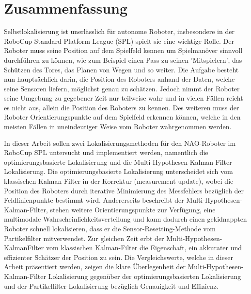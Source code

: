 \thispagestyle{empty}
\chapter*{Zusammenfassung}

Selbstlokalisierung ist unerl{\"a}sslich f{\"u}r autonome Roboter, insbesondere in der RoboCup Standard Platform League (SPL) spielt sie eine wichtige Rolle. Der Roboter muss seine Position auf dem Spielfeld kennen um Spielman{\"o}ver sinnvoll durchf{\"u}hren zu k{\"o}nnen, wie zum Beispiel einen Pass zu seinen 'Mitspielern', das Sch{\"u}tzen des Tores, das Planen von Wegen und so weiter. Die Aufgabe besteht nun haupts{\"a}chlich darin, die Position des Roboters anhand der Daten, welche seine Sensoren liefern, m{\"o}glichst genau zu sch{\"a}tzen. Jedoch nimmt der Roboter seine Umgebung zu gegebener Zeit nur teilweise wahr und in vielen F{\"a}llen reicht es nicht aus, allein die Position des Roboters zu kennen. Des weiteren muss der Roboter Orientierungspunkte auf dem Spielfeld erkennen k{\"o}nnen, welche in den meisten F{\"a}llen in uneindeutiger Weise vom Roboter wahrgenommen werden.

In dieser Arbeit sollen zwei Lokalisierungsmethoden f{\"u}r den NAO-Roboter im RoboCup SPL untersucht und implementiert werden, namentlich die optimierungsbasierte Lokalisierung und die Multi-Hypothesen-Kalman-Filter Lokalisierung. Die optimierungsbasierte Lokalisierung unterscheidet sich vom klassischen Kalman-Filter in der Korrektur (measurement update), wobei die Position des Roboters durch iterative Minimierung des Messfehlers bez{\"u}glich der Feldlinienpunkte bestimmt wird. Andererseits beschreibt der Multi-Hypothesen-Kalman-Filter, stehen weitere Orientierungspunkte zur Verf{\"u}gung, eine multimodale Wahrscheinlichkeitsverteilung und kann dadurch einen gekidnappten Roboter schnell lokalisieren, dass er die Sensor-Resetting-Methode vom Partikelfilter mitverwendet. Zur gleichen Zeit erbt der Multi-Hypothesen-KalmanFilter vom klassischen Kalman-Filter die Eigenschaft, ein akkurater und effizienter Sch{\"a}tzer der Position zu sein. Die Vergleichswerte, welche in dieser Arbeit pr{\"a}sentiert werden, zeigen die klare {\"U}berlegenheit der Multi-Hypothesen-Kalman-Filter Lokalisierung gegen{\"u}ber der optimierungsbasierten Lokalisierung und der Partikelfilter Lokalisierung bez{\"u}glich Genauigkeit und Effizienz.
